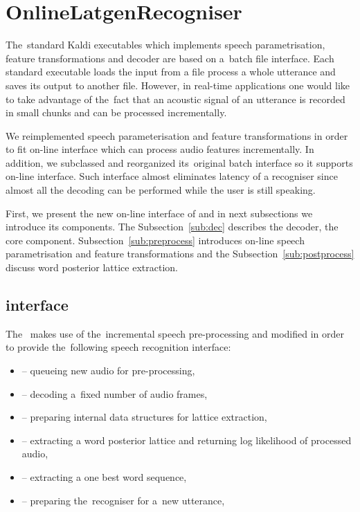 \section{OnlineLatgenRecogniser}
\label{sec:rec}

The~standard Kaldi executables which implements speech parametrisation, feature transformations and decoder are based on a~batch file interface.
Each standard executable loads the input from a file process a whole utterance and saves its output to another file.
However, in real-time applications one would like to take advantage of the~fact that an acoustic signal of an utterance is recorded in small chunks and can be processed incrementally.

We reimplemented speech parameterisation and feature transformations in order to fit on-line interface which can process audio features incrementally.
In addition, we subclassed  and reorganized its~original batch interface so it supports on-line interface.
Such interface almost eliminates latency of a recogniser since almost all the decoding can be performed while the user is still speaking.

First, we present the new on-line interface of  and in next subsections we introduce its components.
The Subsection~\ref{sub:dec} describes the decoder, the core component.
Subsection~\ref{sub:preprocess} introduces on-line speech parametrisation and feature transformations and the Subsection~\ref{sub:postprocess} discuss word posterior lattice extraction.

\subsection{ interface}
\label{sub:verb_c_}
The~ makes use of the~incremental speech pre-processing and modified  in order to provide the~following speech recognition interface:
\begin{itemize}
\item {} -- queueing new audio for pre-processing,
\item {} -- decoding a~fixed number of audio frames,
\item {} -- preparing internal data structures for lattice extraction,
\item {} -- extracting a word posterior lattice and returning log likelihood of processed audio,
\item {} -- extracting a one best word sequence,
\item {} -- preparing the~recogniser for a~new utterance,
\end{itemize}

